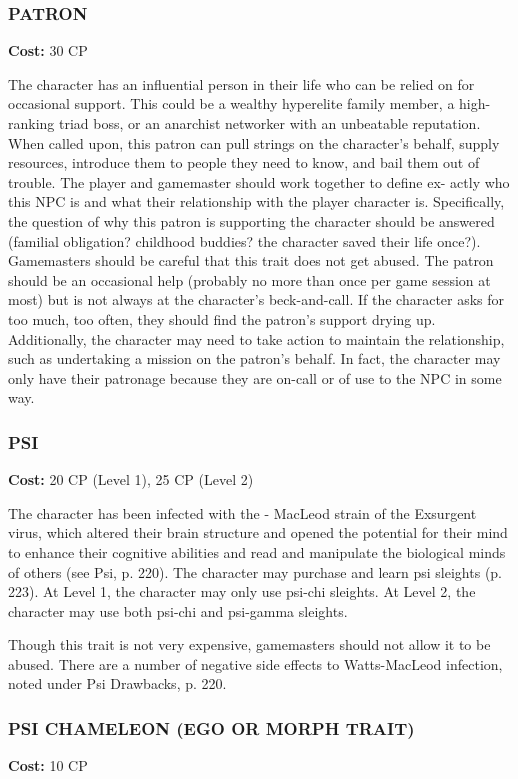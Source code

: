 \subsubsection{PATRON}
\textbf{Cost:} 30 CP

The character has an influential person in their
life who can be relied on for occasional support.
This could be a wealthy hyperelite family member, a
high-ranking triad boss, or an anarchist networker
with an unbeatable reputation. When called upon,
this patron can pull strings on the character’s behalf,
supply resources, introduce them to people they need
to know, and bail them out of trouble. The player
and gamemaster should work together to define ex-
actly who this NPC is and what their relationship
with the player character is. Specifically, the question
of why this patron is supporting the character should
be answered (familial obligation? childhood buddies?
the character saved their life once?). Gamemasters
should be careful that this trait does not get abused.
The patron should be an occasional help (probably
no more than once per game session at most) but is
not always at the character’s beck-and-call. If the
character asks for too much, too often, they should
find the patron’s support drying up. Additionally, the
character may need to take action to maintain the
relationship, such as undertaking a mission on the
patron’s behalf. In fact, the character may only have
their patronage because they are on-call or of use to
the NPC in some way.

\subsubsection{PSI}
\textbf{Cost:} 20 CP (Level 1), 25 CP (Level 2)

The character has been infected with the 	-
MacLeod strain of the Exsurgent virus, which altered
their brain structure and opened the potential for their
mind to enhance their cognitive abilities and read and
manipulate the biological minds of others (see Psi,
p. 220). The character may purchase and learn psi
sleights (p. 223). At Level 1, the character may only
use psi-chi sleights. At Level 2, the character may use
both psi-chi and psi-gamma sleights.

Though this trait is not very expensive, gamemasters
should not allow it to be abused. There are a number
of negative side effects to Watts-MacLeod infection,
noted under Psi Drawbacks, p. 220.

\subsubsection{PSI CHAMELEON (EGO OR MORPH TRAIT)}
\textbf{Cost:} 10 CP

